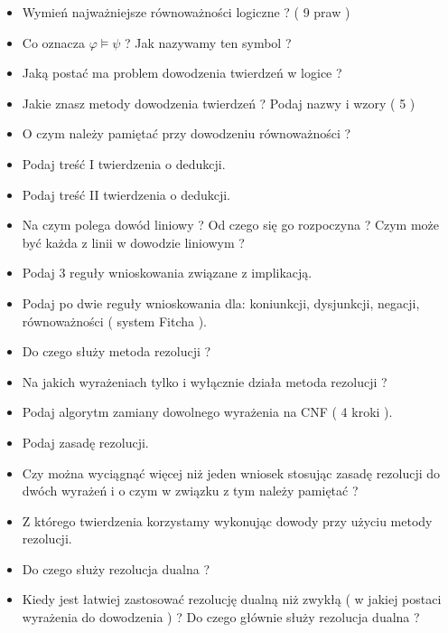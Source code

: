 \documentclass[a4paper,15pt]{article}
\begin{document}
\begin{itemize}
\item Wymień najważniejsze równoważności logiczne ? ( 9 praw )

\item Co oznacza \( \varphi \vDash \psi \) ? Jak nazywamy ten symbol ?

\item Jaką postać ma problem dowodzenia twierdzeń w logice ?

\item Jakie znasz metody dowodzenia twierdzeń ? Podaj nazwy i wzory ( 5 )

\item O czym należy pamiętać przy dowodzeniu równoważności ?

\item Podaj treść I twierdzenia o dedukcji.

\item Podaj treść II twierdzenia o dedukcji.

\item Na czym polega dowód liniowy ? Od czego się go rozpoczyna ? Czym może być każda z linii w dowodzie liniowym ?

\item Podaj 3 reguły wnioskowania związane z implikacją.

\item Podaj po dwie reguły wnioskowania dla: koniunkcji, dysjunkcji, negacji, równoważności ( system Fitcha ).

\item Do czego służy metoda rezolucji ?

\item Na jakich wyrażeniach tylko i wyłącznie działa metoda rezolucji ?

\item Podaj algorytm zamiany dowolnego wyrażenia na CNF ( 4 kroki ).

\item Podaj zasadę rezolucji.

\item Czy można wyciągnąć więcej niż jeden wniosek stosując zasadę rezolucji do dwóch wyrażeń i o czym w związku z tym należy pamiętać ?  

\item Z którego twierdzenia korzystamy wykonując dowody przy użyciu metody rezolucji. 

\item Do czego służy rezolucja dualna ?

\item Kiedy jest łatwiej zastosować rezolucję dualną niż zwykłą ( w jakiej postaci wyrażenia do dowodzenia ) ? Do czego głównie służy rezolucja dualna ?


\end{itemize}
\end{document}
